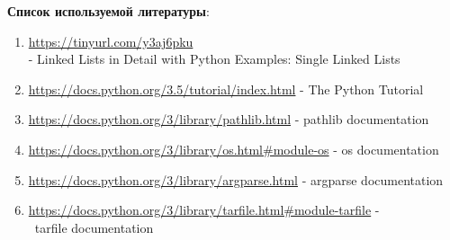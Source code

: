 \documentclass[12pt]{article}
\begin{document}
\par\bigskip
\textbf{Список используемой литературы}:
\begin{enumerate}
\item \url{https://tinyurl.com/y3aj6pku} \\ - Linked Lists in Detail with Python Examples: Single Linked Lists
\item \url{https://docs.python.org/3.5/tutorial/index.html} - The Python Tutorial
\item \url{https://docs.python.org/3/library/pathlib.html} - pathlib documentation
\item \url{https://docs.python.org/3/library/os.html#module-os} - os documentation
\item \url{https://docs.python.org/3/library/argparse.html} - argparse documentation
\item \url{https://docs.python.org/3/library/tarfile.html#module-tarfile} - \\\ tarfile documentation
\end{enumerate}
\end{document}
